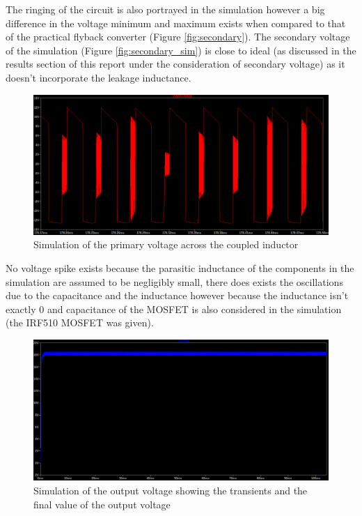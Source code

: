 \documentclass[a4paper, 12pt]{article}
\begin{document}
The ringing of the circuit is also portrayed in the simulation however a big difference in the voltage minimum and maximum exists when compared to that of the practical flyback converter (Figure \ref{fig:secondary}). The secondary voltage of the simulation (Figure \ref{fig:secondary_sim}) is close to ideal (as discussed in the results section of this report under the consideration of secondary voltage) as it doesn't incorporate the leakage inductance.

\begin{figure}[H]
  \centering
  \includegraphics[width=\textwidth]{images/primary_sim.png}
  \caption{Simulation of the primary voltage across the coupled inductor}
  \label{fig:primary_sim}
\end{figure}

No voltage spike exists because the parasitic inductance of the components in the simulation are assumed to be negligibly small, there does exists the oscillations due to the capacitance and the inductance however because the inductance isn't exactly $0$ and capacitance of the MOSFET is also considered in the simulation (the IRF510 MOSFET was given).

\begin{figure}[H]
  \centering
  \includegraphics[width=\textwidth]{images/output_1_sim.png}
  \caption{Simulation of the output voltage showing the transients and the final value of the output voltage}
  \label{fig:output_1_sim}
\end{figure} 
\end{document}
